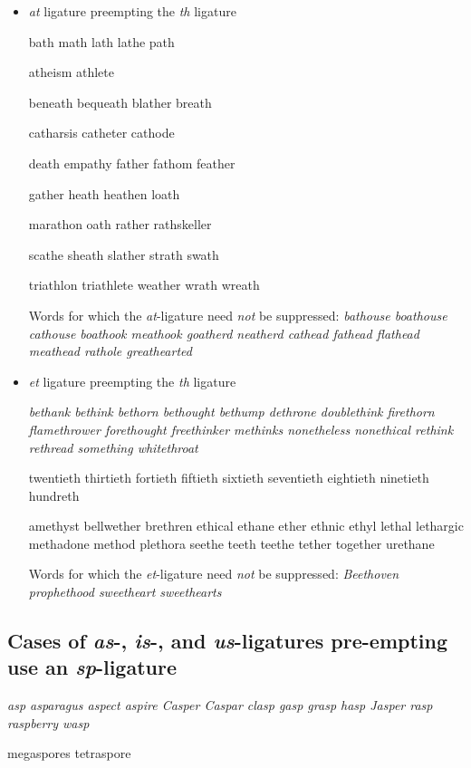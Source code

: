 \begin{itemize}
\item \emph{at} ligature preempting the \emph{th} ligature

\bgroup \em

bath math lath lathe path 

atheism athlete 

beneath bequeath blather breath 

catharsis catheter cathode 

death empathy father fathom feather 

gather heath heathen loath

marathon oath rather rathskeller

scathe sheath slather strath swath 

triathlon triathlete weather wrath wreath 


\egroup
\medskip
Words for which the \emph{at}-ligature need \emph{not} be suppressed:
\emph{bathouse boathouse cathouse boathook meathook goatherd neatherd cathead fathead flathead meathead rathole greathearted}


\item \emph{et} ligature preempting the \emph{th} ligature

\bgroup \em
bethank bethink bethorn bethought bethump dethrone doublethink firethorn flamethrower forethought freethinker methinks nonetheless nonethical rethink rethread something whitethroat

twentieth thirtieth fortieth fiftieth sixtieth seventieth eightieth ninetieth hundreth 

amethyst bellwether brethren ethical ethane ether ethnic ethyl lethal lethargic methadone method plethora seethe teeth teethe tether together urethane 

\egroup
\medskip
Words for which the \emph{et}-ligature need \emph{not} be suppressed:
\emph{Beethoven prophethood sweetheart sweethearts }

\end{itemize}


\subsection*{Cases of \emph{as}-, \emph{is}-, and \emph{us}-ligatures pre-empting use an \emph{sp}-ligature}

\bgroup \em
asp asparagus aspect aspire Casper Caspar clasp gasp grasp hasp Jasper rasp raspberry wasp  

megaspores tetraspore

